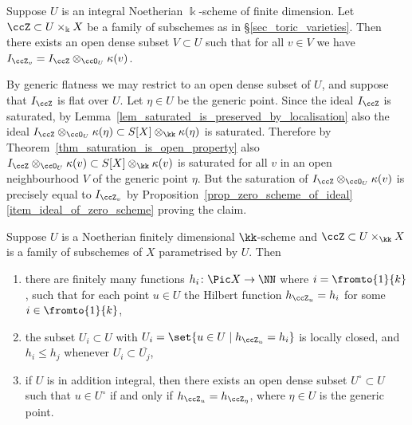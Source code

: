 \documentclass[12pt,a4paper]{article}
\begin{document}
\begin{lemma}
   \label{lem_ideal_of_restriction_is_restriction_of_ideal_on_open}
   Suppose $U$ is an integral Noetherian  $\Bbbk$-scheme of finite dimension. Let  $\ccZ \subset U \times_{\Bbbk} X$ be a family of subschemes as in \S\ref{sec_toric_varieties}.
   Then there exists an open dense subset
   $V\subset U$ such that for all $v\in V$
   we have
   $I_{\ccZ_{v}} = I_{\ccZ} \otimes_{\ccO_U}\kappa(v)$.
\end{lemma}

\begin{prf}
   By generic flatness  \cite[\href{https://stacks.math.columbia.edu/tag/052A}{Tag 052A}]{stacks_project} we may restrict to an open dense subset of $U$, and suppose that
   $I_{\ccZ}$ is flat over $U$.
   Let $\eta\in U$ be the generic point.
   Since the ideal $I_{\ccZ}$ is saturated, by Lemma~\ref{lem_saturated_is_preserved_by_localisation}
   also the ideal $I_{\ccZ} \otimes_{\ccO_U}\kappa(\eta) \subset S[X] \otimes_{\kk} \kappa(\eta)$
   is saturated.
   Therefore by Theorem~\ref{thm_saturation_is_open_property}
   also $I_{\ccZ} \otimes_{\ccO_U}\kappa(v) \subset S[X] \otimes_{\kk} \kappa(v)$
   is saturated for all $v$ in an open neighbourhood $V$ of the generic point $\eta$.
   But the saturation of $I_{\ccZ} \otimes_{\ccO_U}\kappa(v)$ is precisely equal to $I_{\ccZ_{v}}$ by Proposition~\ref{prop_zero_scheme_of_ideal}\ref{item_ideal_of_zero_scheme} proving the claim.
\end{prf}

\begin{thm}
   \label{thm_structure_of_Hilbert_functions_of_fibres}
   Suppose $U$ is a Noetherian finitely dimensional
   $\kk$-scheme and $\ccZ \subset U \times_{\kk} X$ is a family of subschemes of $X$ parametrised by $U$. Then
   \begin{enumerate}
    \item  \label{item_finitely_many_Hilbert_functions_in_a_family}
       there are finitely many functions   $h_i \colon \Pic X \to \NN$
       where  $i = \fromto{1}{k}$,  such that for each point $u \in U$
       the Hilbert function $h_{\ccZ_u}= h_i$ for some $i\in \fromto{1}{k}$,
    \item
    \label{item_Hilbert_function_stratification_is_locally_closed}
       the subset $U_i\subset U$ with $U_i=\set{u\in U\mid h_{\ccZ_u} = h_i}$ is locally closed,
       and $h_i \leqslant h_j$ whenever $U_i \subset \overline{U_j}$,
    \item \label{item_generic_Hilbert_function_is_open}
      if $U$ is in addition integral, then there exists an open dense subset $U^{\circ} \subset U$ such that $u\in U^{\circ}$
      if and only if $h_{\ccZ_u} = h_{\ccZ_{\eta}}$, where $\eta \in U$ is the generic point.
   \end{enumerate}
\end{thm}
\end{document}

